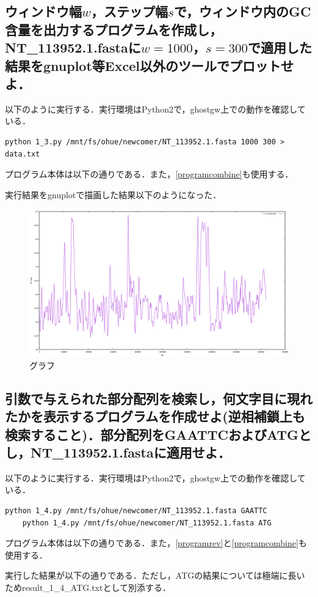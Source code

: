 \documentclass[uplatex,a4j]{jsarticle}
\begin{document}
  \subsection{ウィンドウ幅$w$，ステップ幅$s$で，ウィンドウ内のGC含量を出力するプログラムを作成し，NT\_113952.1.fastaに$w=1000$，$s=300$で適用した結果をgnuplot等Excel以外のツールでプロットせよ．}
  以下のように実行する．実行環境はPython2で，ghostgw上での動作を確認している．
  \begin{lstlisting}[caption=実行方法, label=run3]
    python 1_3.py /mnt/fs/ohue/newcomer/NT_113952.1.fasta 1000 300 > data.txt
  \end{lstlisting}
  プログラム本体は以下の通りである．また，\ref{programcombine}も使用する．
  
  実行結果をgnuplotで描画した結果以下のようになった．
  \begin{figure}[htbp]
    \begin{center}
      \includegraphics[width=15cm]{1_3_plot.png}
      \caption{グラフ}
    \end{center}
  \end{figure}
  
  \subsection{引数で与えられた部分配列を検索し，何文字目に現れたかを表示するプログラムを作成せよ(逆相補鎖上も検索すること)．部分配列をGAATTCおよびATGとし，NT\_113952.1.fastaに適用せよ．}
  以下のように実行する．実行環境はPython2で，ghostgw上での動作を確認している．
  \begin{lstlisting}[caption=実行方法, label=run4]
    python 1_4.py /mnt/fs/ohue/newcomer/NT_113952.1.fasta GAATTC
    python 1_4.py /mnt/fs/ohue/newcomer/NT_113952.1.fasta ATG
  \end{lstlisting}
  プログラム本体は以下の通りである．また，\ref{programrev}と\ref{programcombine}も使用する．
  
  
  実行した結果が以下の通りである．ただし，ATGの結果については極端に長いためresult\_1\_4\_ATG.txtとして別添する．
  
  
\end{document}
